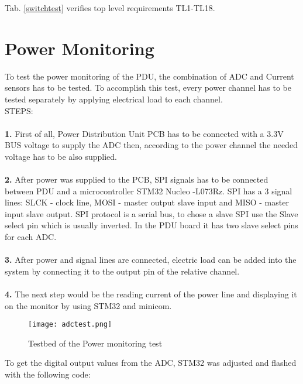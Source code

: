	Tab. \ref{switchtest} verifies top level requirements TL1-TL18.
	\section{Power Monitoring}
	
	To test the power monitoring of the PDU, the combination of ADC and Current sensors has to be tested. To accomplish this test, every power channel has to be tested separately by applying electrical load to each channel. \\
	
	STEPS:\\ \\
	\textbf{1.} First of all, Power Distribution Unit PCB has to be connected with a 3.3V BUS voltage to supply the ADC then, according to the power channel the needed voltage has to be also supplied. \\ \\
	\textbf{2.} After power  was supplied to the PCB, SPI signals has to be connected between PDU and a microcontroller STM32 Nucleo -L073Rz. SPI has a 3 signal lines: SLCK - clock line, MOSI - master output slave input and MISO - master input slave output. SPI protocol is a serial bus, to chose a slave SPI use the Slave select pin which is usually inverted. In the PDU board it has two slave select pins for each ADC.\\ \\
	\textbf{3.} After power and signal lines are connected, electric load can be added into the system by connecting it to the output pin of the relative channel.\\ \\
	\textbf{4.} The next step would be the reading current of the power line and displaying it on the monitor by using STM32 and minicom.
	  
	\begin{figure}[h]
		\centering
		\texttt{[image: adctest.png]}
		\caption{Testbed of the Power monitoring test}
		\label{fig: adctest}
	\end{figure}
	 
	 To get the digital output values from the ADC, STM32 was adjusted and flashed with the following code:
	 
